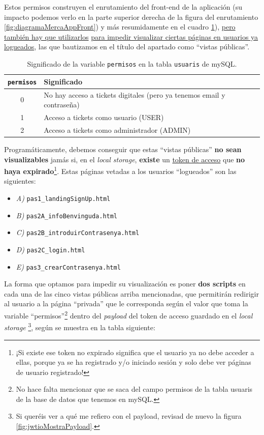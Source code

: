 \documentclass[a4paper,12pt]{report}
\begin{document}
	Estos permisos construyen el enrutamiento del front-end de la aplicación (su impacto podemos verlo en la parte superior derecha de la figura del enrutamiento \ref{fig:diagramaMercaAppFront}) y más resumidamente en el cuadro \ref{table:permisos}), \underline{pero también hay que utilizarlos} \underline{para impedir visualizar ciertas páginas en usuarios ya logueados}, las que bautizamos en el título del apartado como ``vistas públicas''.
	
	\begin{table}[H]
		\centering
		\caption{Significado de la variable \texttt{permisos} en la tabla \texttt{usuaris} de mySQL.}
		\begin{tabular}{|c|l|}
			\hline
			\textbf{\texttt{permisos}} & \textbf{Significado} \\
			\hline
			0 & No hay acceso a tickets digitales (pero ya tenemos email y contraseña) \\
			1 & Acceso a tickets como usuario (USER) \\
			2 & Acceso a tickets como administrador (ADMIN) \\
			\hline
		\end{tabular}
		\label{table:permisos}
		
	\end{table}
	
	Programáticamente, debemos conseguir que estas ``vistas públicas'' \textbf{no sean visualizables} jamás si, en el \textit{local storage}, \textbf{existe}  un \underline{token de acceso} que \textbf{no haya expirado}\footnote{¡Si existe ese token no expirado significa que el usuario ya no debe acceder a ellas, porque ya se ha registrado y/o iniciado sesión y solo debe ver páginas de usuario registrado!}. Estas páginas vetadas a los usuarios ``logueados'' son las siguientes:
	
	\vspace{0em}
	\begin{itemize}
		\setlength{\itemsep}{-.5em}
		\item \textit{A)} \texttt{pas1\_landingSignUp.html}
		\item \textit{B)} \texttt{pas2A\_infoBenvinguda.html}
		\item \textit{C)} \texttt{pas2B\_introduirContrasenya.html}
		\item \textit{D)} \texttt{pas2C\_login.html}
		\item \textit{E)} \texttt{pas3\_crearContrasenya.html}
	\end{itemize}
	
	La forma que optamos para impedir su visualización es poner \textbf{dos scripts} en cada una de las cinco vistas públicas arriba mencionadas, que permitirán redirigir al usuario a la página ``privada'' que le corresponda según el valor que toma la variable ``permisos''\footnote{No hace falta mencionar que se saca del campo permisos de la tabla usuaris de la base de datos que tenemos en mySQL.} dentro del \textit{payload} del token de acceso guardado en el \textit{local storage} \footnote{Si queréis ver a qué me refiero con el payload, revisad de nuevo la figura \ref{fig:jwtioMostraPayload}.}, según se muestra en la tabla siguiente:
		
\end{document}

